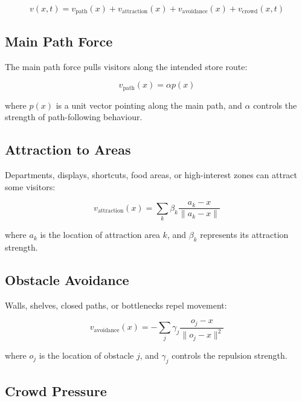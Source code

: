 \documentclass[11pt,a4paper]{article}
\begin{document}
\begin{equation}
v(x,t) = v_{\text{path}}(x) + v_{\text{attraction}}(x) + v_{\text{avoidance}}(x) + v_{\text{crowd}}(x,t)
\end{equation}

\subsection{Main Path Force}

The main path force pulls visitors along the intended store route:

\begin{equation}
v_{\text{path}}(x) = \alpha p(x)
\end{equation}

where $p(x)$ is a unit vector pointing along the main path, and $\alpha$ controls the strength of path-following behaviour.

\subsection{Attraction to Areas}

Departments, displays, shortcuts, food areas, or high-interest zones can attract some visitors:

\begin{equation}
v_{\text{attraction}}(x) = \sum_k \beta_k \frac{a_k - x}{\|a_k - x\|}
\end{equation}

where $a_k$ is the location of attraction area $k$, and $\beta_k$ represents its attraction strength.

\subsection{Obstacle Avoidance}

Walls, shelves, closed paths, or bottlenecks repel movement:

\begin{equation}
v_{\text{avoidance}}(x) = - \sum_j \gamma_j \frac{o_j - x}{\|o_j - x\|^2}
\end{equation}

where $o_j$ is the location of obstacle $j$, and $\gamma_j$ controls the repulsion strength.

\subsection{Crowd Pressure}
\end{document}
